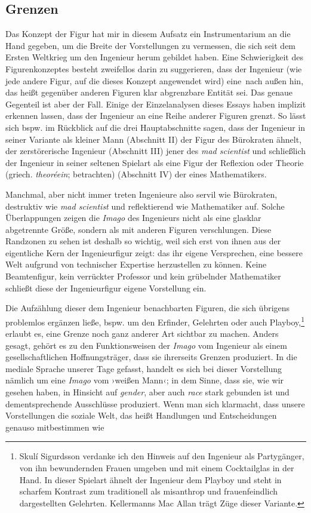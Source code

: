 \documentclass[%
	fontsize=10pt,%
	twoside,%
	headings=optiontoheadandtoc,%
	showtrims]{scrbook}
\renewcommand{\texttt}{\nohyphens} %
\begin{document}
\subsection[Grenzen]{Grenzen}
\par Das Konzept der Figur hat mir in diesem Aufsatz ein Instrumentarium an die Hand gegeben, um die Breite der Vorstellungen zu vermessen, die sich seit dem Ersten Weltkrieg um den Ingenieur herum gebildet haben. Eine Schwierigkeit des Figurenkonzeptes besteht zweifellos darin zu suggerieren, dass der Ingenieur (wie jede andere Figur, auf die dieses Konzept angewendet wird) \texttt{eine~nach} außen hin, das heißt gegenüber anderen Figuren klar abgrenzbare Entität sei. Das genaue Gegenteil ist aber der Fall. Einige der Einzelanalysen dieses Essays haben implizit erkennen lassen, dass der Ingenieur an eine Reihe anderer Figuren grenzt. So lässt sich bspw. im Rückblick auf die drei Hauptabschnitte sagen, dass der Ingenieur in seiner Variante als kleiner Mann (Abschnitt II) der Figur des Bürokraten ähnelt, der zerstörerische Ingenieur (Abschnitt III) jener des \emph{mad scientist} und schließlich der Ingenieur in seiner seltenen Spielart als eine Figur der Reflexion oder Theorie (griech. \emph{theoréein}; betrachten) (Abschnitt IV) der eines Mathematikers.\par Manchmal, aber nicht immer treten Ingenieure also servil wie Bürokraten, destruktiv wie \emph{mad scientist} und reflektierend wie Mathematiker auf. Solche Überlappungen zeigen die \emph{Imago} des Ingenieurs nicht als eine glasklar abgetrennte Größe, sondern als mit anderen Figuren verschlungen. Diese Randzonen zu sehen ist deshalb so wichtig, weil sich erst von ihnen aus der eigentliche Kern der Ingenieurfigur zeigt: das ihr eigene Versprechen, eine bessere Welt aufgrund von technischer Expertise herzustellen zu können. Keine Beamtenfigur, kein verrückter Professor und kein grübelnder Mathematiker schließt diese der Ingenieurfigur eigene Vorstellung ein.\par Die Aufzählung dieser dem Ingenieur benachbarten Figuren, die sich übrigens problemlos ergänzen ließe, bspw. um den Erfinder, Gelehrten oder auch Playboy,\footnote{Skulí Sigurdsson verdanke ich den Hinweis auf den Ingenieur als Partygänger, von ihn bewundernden Frauen umgeben und mit einem Cocktailglas in der Hand. In dieser Spielart ähnelt der Ingenieur dem Playboy und steht in scharfem Kontrast zum traditionell als misanthrop und frauenfeindlich dargestellten Gelehrten. Kellermanns Mac Allan trägt Züge dieser Variante.}  erlaubt es, eine Grenze noch ganz anderer Art sichtbar zu machen. Anders gesagt, gehört es zu den Funktionsweisen der \emph{Imago} vom Ingenieur als einem gesellschaftlichen Hoffnungsträger, dass sie ihrerseits Grenzen produziert. In die mediale Sprache unserer Tage gefasst, handelt es sich bei dieser Vorstellung nämlich um eine \emph{Imago} vom ›weißen Mann‹; in dem Sinne, dass sie, wie wir gesehen haben, in Hinsicht auf \emph{\texttt{gender}}, aber auch \emph{race} stark gebunden ist und dementsprechende Ausschlüsse produziert. Wenn man sich klarmacht, dass \texttt{unsere} \texttt{Vorstellungen} die soziale Welt, das heißt Handlungen und Entscheidungen genauso mitbestimmen wie 
\end{document}
